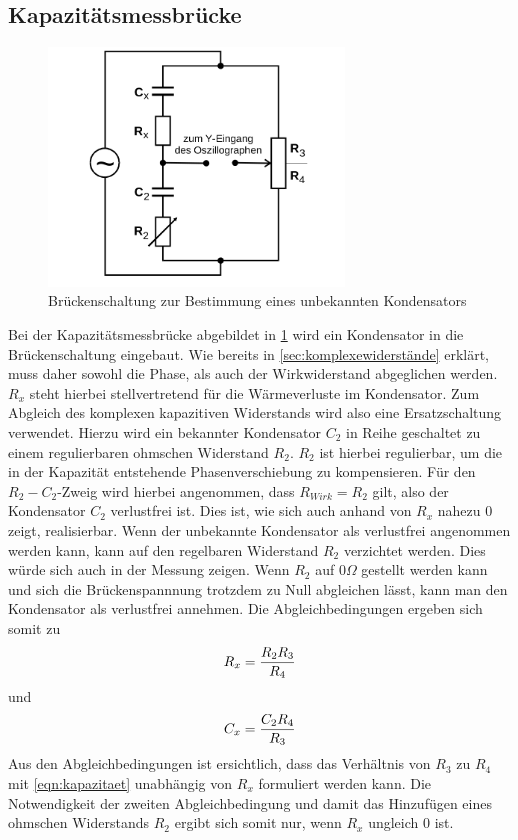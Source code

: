 \subsection{Kapazitätsmessbrücke}
\begin{figure}
  \centering
  \includegraphics[width=0.7\textwidth]{Bilder/kapazitaetmessbruecke.png}
  \caption{Brückenschaltung zur Bestimmung eines unbekannten Kondensators \cite{Anleitung}}
  \label{fig:kapazitätsmessbrücke}
\end{figure}
Bei der Kapazitätsmessbrücke abgebildet in \ref{fig:kapazitätsmessbrücke} wird ein Kondensator in die Brückenschaltung eingebaut.
Wie bereits in \ref{sec:komplexewiderstände} erklärt, muss daher sowohl die Phase, als auch der Wirkwiderstand abgeglichen werden.
$R_x$ steht hierbei stellvertretend für die Wärmeverluste im Kondensator. Zum Abgleich des komplexen kapazitiven Widerstands wird also eine Ersatzschaltung verwendet.
Hierzu wird ein bekannter Kondensator $C_2$ in Reihe geschaltet zu einem regulierbaren ohmschen Widerstand $R_2$.
$R_2$ ist hierbei regulierbar, um die in der Kapazität entstehende Phasenverschiebung zu kompensieren. Für den $R_2-C_2$-Zweig wird hierbei angenommen, dass $R_{Wirk}=R_2$ gilt, also der Kondensator $C_2$ verlustfrei ist. Dies ist, wie sich auch anhand von $R_x$ nahezu 0 zeigt, realisierbar.
Wenn der unbekannte Kondensator als verlustfrei angenommen werden kann, kann auf den regelbaren Widerstand $R_2$ verzichtet werden.
Dies würde sich auch in der Messung zeigen. Wenn $R_2$ auf $0 \Omega$ gestellt werden kann und sich die Brückenspannnung trotzdem zu Null abgleichen lässt, kann man den Kondensator als verlustfrei annehmen.
Die Abgleichbedingungen ergeben sich somit zu
\begin{equation}
\centering
\label{eqn:kapwiderstand}
R_x=\frac{R_2R_3}{R_4}
\end{equation}
und
\begin{equation}
\centering
\label{eqn:kapazitaet}
C_x=\frac{C_2R_4}{R_3}
\end{equation}
Aus den Abgleichbedingungen ist ersichtlich, dass das Verhältnis von $R_3$ zu $R_4$ mit \eqref{eqn:kapazitaet} unabhängig von $R_x$ formuliert werden kann.
Die Notwendigkeit der zweiten Abgleichbedingung und damit das Hinzufügen eines ohmschen Widerstands $R_2$ ergibt sich somit nur, wenn $R_x$ ungleich 0 ist.

